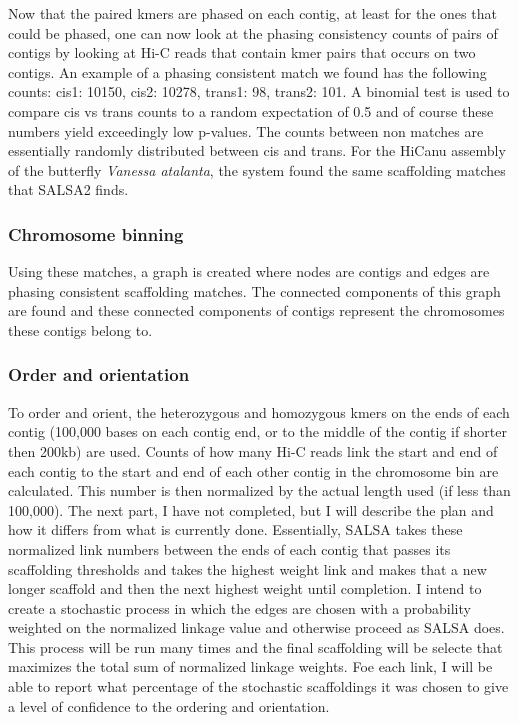 {\par{
Now that the paired kmers are phased on each contig, at least for the ones that could be phased, one can now look at the phasing consistency counts of pairs of contigs by looking at Hi-C reads that contain kmer pairs that occurs on two contigs. An example of a phasing consistent match we found has the following counts:  cis1: 10150, cis2: 10278, trans1: 98, trans2: 101. A binomial test is used to compare cis vs trans counts to a random expectation of 0.5 and of course these numbers yield exceedingly low p-values. The counts between non matches are essentially randomly distributed between cis and trans. For the HiCanu assembly of the butterfly \textit{Vanessa atalanta}, the system found the same scaffolding matches that SALSA2 finds.
}

\subsubsection{Chromosome binning}

\par{
Using these matches, a graph is created where nodes are contigs and edges are phasing consistent scaffolding matches. The connected components of this graph are found and these connected components of contigs represent the chromosomes these contigs belong to. 
}

\subsubsection{Order and orientation}

\par{
To order and orient, the heterozygous and homozygous kmers on the ends of each contig (100,000 bases on each contig end, or to the middle of the contig if shorter then 200kb) are used. Counts of how many Hi-C reads link the start and end of each contig to the start and end of each other contig in the chromosome bin are calculated. This number is then normalized by the actual length used (if less than 100,000). The next part, I have not completed, but I will describe the plan and how it differs from what is currently done. Essentially, SALSA takes these normalized link numbers between the ends of each contig that passes its scaffolding thresholds and takes the highest weight link and makes that a new longer scaffold and then the next highest weight until completion. I intend to create a stochastic process in which the edges are chosen with a probability weighted on the normalized linkage value and otherwise proceed as SALSA does. This process will be run many times and the final scaffolding will be selecte that maximizes the total sum of normalized linkage weights. Foe each link, I will be able to report what percentage of the stochastic scaffoldings it was chosen to give a level of confidence to the ordering and orientation.
}

}

